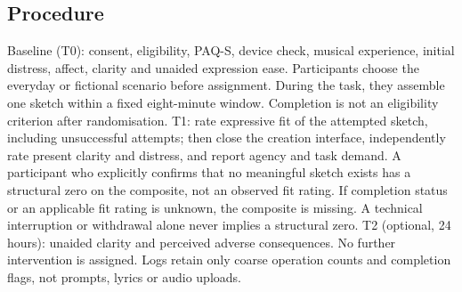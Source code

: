 \documentclass[11pt,a4paper]{article}
\begin{document}
\subsection{Procedure}
Baseline (T0): consent, eligibility, PAQ-S, device check, musical experience, initial distress, affect, clarity and unaided expression ease. Participants choose the everyday or fictional scenario before assignment. During the task, they assemble one sketch within a fixed eight-minute window. Completion is not an eligibility criterion after randomisation. T1: rate expressive fit of the attempted sketch, including unsuccessful attempts; then close the creation interface, independently rate present clarity and distress, and report agency and task demand. A participant who explicitly confirms that no meaningful sketch exists has a structural zero on the composite, not an observed fit rating. If completion status or an applicable fit rating is unknown, the composite is missing. A technical interruption or withdrawal alone never implies a structural zero. T2 (optional, 24 hours): unaided clarity and perceived adverse consequences. No further intervention is assigned. Logs retain only coarse operation counts and completion flags, not prompts, lyrics or audio uploads.
\end{document}
